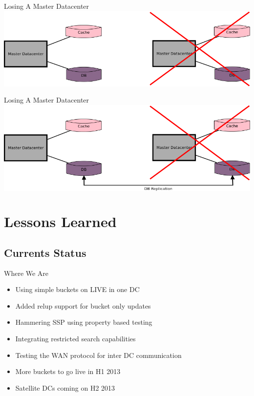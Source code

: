 \documentclass[aspectratio=169]{beamer}
\begin{document}
\begin{frame}{Losing A Master Datacenter}
    \includegraphics[width=\textwidth]{images/lostmasterdc.png}
\end{frame}

\begin{frame}{Losing A Master Datacenter}
    \includegraphics[width=\textwidth]{images/lostmasterdchope.png}
\end{frame}

\section{Lessons Learned}

\subsection{Currents Status}
\begin{frame}{Where We Are}
    \begin{itemize}
        \item Using simple buckets on LIVE in one DC
        \item Added relup support for bucket only updates
        \item Hammering SSP using property based testing
        \item Integrating restricted search capabilities
        \item Testing the WAN protocol for inter DC communication
        \item More buckets to go live in H1 2013
        \item Satellite DCs coming on H2 2013
    \end{itemize}
\end{frame}
\end{document}
